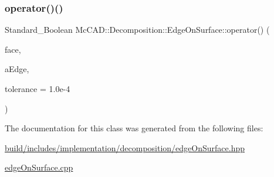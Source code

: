\subsubsection{\texorpdfstring{operator()()}{operator()()}\hspace{0.1cm}{\footnotesize\ttfamily [2/2]}}
{\footnotesize\ttfamily Standard\+\_\+\+Boolean Mc\+C\+A\+D\+::\+Decomposition\+::\+Edge\+On\+Surface\+::operator() (\begin{DoxyParamCaption}\item[{const Topo\+D\+S\+\_\+\+Face \&}]{face,  }\item[{const \hyperlink{classMcCAD_1_1Geometry_1_1Edge}{Mc\+C\+A\+D\+::\+Geometry\+::\+Edge} \&}]{a\+Edge,  }\item[{Standard\+\_\+\+Real}]{tolerance = {\ttfamily 1.0e-\/4} }\end{DoxyParamCaption})}



The documentation for this class was generated from the following files\+:\begin{DoxyCompactItemize}
\item 
\hyperlink{build_2includes_2implementation_2decomposition_2edgeOnSurface_8hpp}{build/includes/implementation/decomposition/edge\+On\+Surface.\+hpp}\item 
\hyperlink{edgeOnSurface_8cpp}{edge\+On\+Surface.\+cpp}\end{DoxyCompactItemize}
